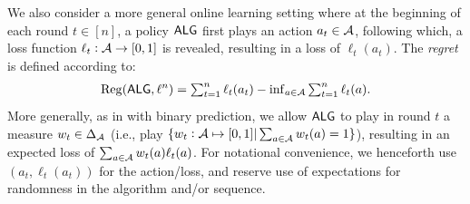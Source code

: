 



We also consider a more general online learning setting where at the beginning of each round $t \in [n]$, a policy $\mathsf{ALG}$ first plays an action $a_t \in \mathcal{A}$, following which, a loss function $\ell_t:\mathcal{A}\to [0,1]$ is revealed, resulting in a loss of $\ell_t(a_t)$. The \emph{regret} is defined according to:
\begin{align}
\label{eq:RegDefnGeneral}
    \mathrm{Reg}(\mathsf{ALG},\ell^n) = \textstyle\sum_{t=1}^n \ell_t(a_t) - \inf_{a \in \mathcal{A}} \textstyle\sum_{t=1}^n \ell_t(a).
\end{align} 
More generally, as in with binary prediction, we allow $\mathsf{ALG}$ to play in round $t$ a measure $w_t\in\Delta_{\mathcal{A}}$ (i.e., play $\{w_t:\mathcal{A}\mapsto[0,1]|\sum_{a\in\mathcal{A}}w_t(a)=1\}$), resulting in an expected loss of $\sum_{a\in\mathcal{A}}w_t(a)\ell_t(a)$. For notational convenience, we henceforth use $(a_t,\ell_t(a_t))$ for the action/loss, and reserve use of expectations for randomness in the algorithm and/or sequence.

